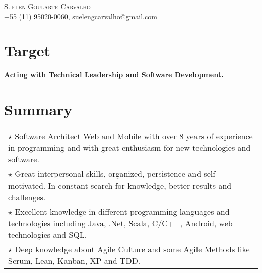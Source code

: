 \documentclass[a4paper, oneside, final]{scrartcl}
\newcommand{\vspc}{\vspace{0.15cm}} %
\begin{document}
\begin{center}
\textsc{\Huge{Suelen Goularte Carvalho}} \vspc\\
{\small +55 (11) 95020-0060, suelengcarvalho@gmail.com} 


\section{Target}
	{\bf Acting with Technical Leadership and Software Development.}



\section{Summary}
\begin{tabularx}{1\linewidth}{X}
	$\star$ Software Architect Web and Mobile with over 8 years of experience in programming and with great enthusiasm for new technologies and software. \vspc\\
	
	$\star$ Great interpersonal skills, organized, persistence and self-motivated. In constant search for knowledge, better results and challenges. \vspc\\
	
	$\star$ Excellent knowledge in different programming languages and technologies including Java, .Net, Scala, C/C++, Android, web technologies and SQL. \vspc\\

	$\star$ Deep knowledge about Agile Culture and some Agile Methods like Scrum, Lean, Kanban, XP and TDD.\vspc\\
	

\end{tabularx}
\end{center}
\end{document}
